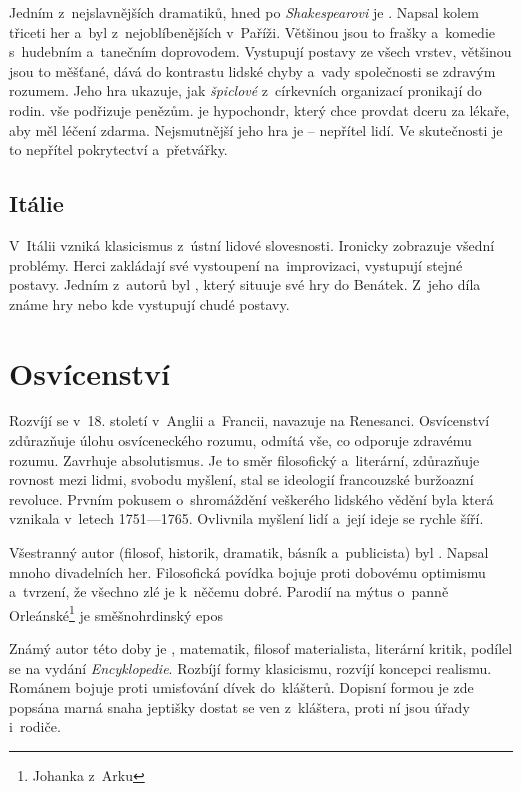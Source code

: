 Jedním z~nejslavnějších dramatiků, hned po \emph{Shakespearovi} je
. Napsal kolem třiceti her a~byl z~nejoblíbenějších
v~Paříži. Většinou jsou to frašky a~komedie s~hudebním a~tanečním
doprovodem. Vystupují postavy ze všech vrstev, většinou jsou to
měšťané, dává do kontrastu lidské chyby a~vady společnosti se zdravým
rozumem. Jeho hra  ukazuje, jak \textit{špiclové} 
z~církevních organizací pronikají do rodin.  vše podřizuje
penězům.  je hypochondr, který chce provdat
dceru za lékaře, aby měl léčení zdarma. Nejsmutnější jeho hra
je  -- nepřítel lidí. Ve skutečnosti je to nepřítel
pokrytectví a~přetvářky.

\subsection*{Itálie}
V~Itálii vzniká klasicismus z~ústní lidové slovesnosti. Ironicky 
zobrazuje všední problémy. Herci zakládají své vystoupení
na~improvizaci, vystupují stejné postavy. Jedním z~autorů byl
, který situuje své hry do Benátek. Z~jeho díla
známe hry  nebo  
kde vystupují chudé postavy.

\section{Osvícenství}
Rozvíjí se v~18. století v~Anglii a~Francii, navazuje na Renesanci.
Osvícenství zdůrazňuje úlohu osvíceneckého rozumu, odmítá vše, co
odporuje zdravému rozumu. Zavrhuje absolutismus. Je to směr filosofický
a~literární, zdůrazňuje rovnost mezi lidmi, svobodu myšlení, stal se
ideologií francouzské buržoazní revoluce. Prvním pokusem o~shromáždění
veškerého lidského vědění byla 
která vznikala v~letech 1751---1765. Ovlivnila myšlení lidí a~její ideje
se rychle šíří. 

Všestranný autor (filosof, historik, dramatik, básník a~publicista) byl
. Napsal mnoho divadelních her. Filosofická povídka
 bojuje proti dobovému optimismu a~tvrzení, že všechno zlé
je k~něčemu dobré. Parodií na mýtus o~panně Orleánské\footnote{Johanka z~Arku}
je směšnohrdinský epos 

Známý autor této doby je , matematik, filosof
materialista, literární kritik, podílel se na vydání
\emph{Encyklopedie}. Rozbíjí formy klasicismu, rozvíjí koncepci
realismu. Románem  bojuje proti umisťování dívek
do~klášterů. Dopisní formou je zde popsána marná snaha jeptišky dostat
se ven z~kláštera, proti ní jsou úřady i~rodiče.

